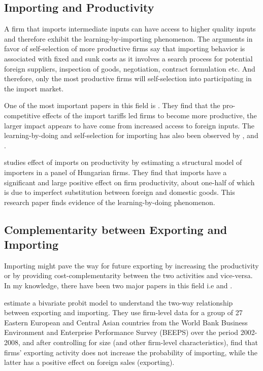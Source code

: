 \documentclass[12pt]{article}
\begin{document}
\subsection*{Importing and Productivity}


A firm that imports intermediate inputs can have access to
higher quality inputs and therefore exhibit the 
learning-by-importing phenomenon.  
The arguments in favor of self-selection of more productive firms say
that importing behavior is associated with  fixed and
sunk costs as it involves a search process for
potential foreign suppliers, inspection of goods, negotiation, contract formulation
etc. And therefore, only the most productive firms will self-selection
into participating in the import market.  

One of the most important papers in this field
is \textcite{topalova2011trade}. They find that the pro-competitive
effects of the import tariffs led firms to become more
productive, the larger impact appears to have come from 
increased access to foreign inputs. The learning-by-doing and
self-selection for importing has also been observed by
\textcite{muuls2009imports}, and \textcite{kasahara2008does}. 

\textcite{halpern2011imported} studies effect of imports on productivity by estimating a structural
model of importers in a panel of Hungarian firms. They find that imports have
a significant and large positive effect on firm productivity, about one-half of which is due
to imperfect substitution between foreign and domestic goods. This
research paper finds evidence of the learning-by-doing phenomenon. 

\subsection*{Complementarity between Exporting and Importing}

Importing  might pave the way for future
exporting by increasing the productivity or by providing
cost-complementarity between the two activities and vice-versa. 
In my knowledge, there have been two major papers in this field
i.e \textcite{aristei2013firms} and \textcite{kasahara2013productivity}. 

\textcite{aristei2013firms} estimate a bivariate probit model to
understand the two-way relationship between exporting and importing. 
They use  firm-level data for a group of 27 Eastern European and 
Central Asian countries from the World Bank Business Environment 
and Enterprise Performance Survey (BEEPS) over the period 2002-2008, 
and after controlling for size (and other firm-level characteristics),
find that firms’ exporting activity does not increase the
probability of importing, while the latter has a positive effect
 on foreign sales (exporting). 
\end{document}
